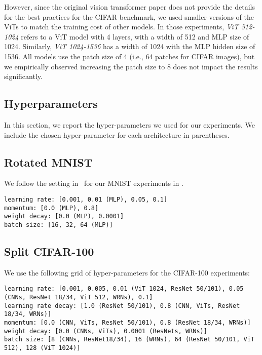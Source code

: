 However, since the original vision transformer paper does not provide the details for the best practices for the CIFAR benchmark, we used smaller versions of the ViTs to match the training cost of other models. In those experiments, \emph{ViT 512-1024} refers to a ViT model with 4 layers, with a width of 512 and MLP size of 1024. Similarly, \emph{ViT 1024-1536} has a width of 1024 with the MLP hidden size of 1536. All models use the patch size of 4 (i.e., 64 patches for CIFAR images), but we empirically observed increasing the patch size to 8 does not impact the results significantly.


\subsection{Hyperparameters}
In this section, we report the hyper-parameters we used for our experiments. We include the chosen hyper-parameter for each architecture in parentheses.

\subsection{Rotated MNIST}
We follow the setting in~\citep{Mirzadeh2021WideNN} for our MNIST experiments in .
\begin{scriptsize}
\begin{verbatim}
learning rate: [0.001, 0.01 (MLP), 0.05, 0.1]
momentum: [0.0 (MLP), 0.8]
weight decay: [0.0 (MLP), 0.0001]
batch size: [16, 32, 64 (MLP)]
\end{verbatim}
\end{scriptsize}

\subsection{Split CIFAR-100}
We use the following grid of hyper-parameters for the CIFAR-100 experiments:

\begin{scriptsize}
\begin{verbatim}
learning rate: [0.001, 0.005, 0.01 (ViT 1024, ResNet 50/101), 0.05 (CNNs, ResNet 18/34, ViT 512, WRNs), 0.1]
learning rate decay: [1.0 (ResNet 50/101), 0.8 (CNN, ViTs, ResNet 18/34, WRNs)]
momentum: [0.0 (CNN, ViTs, ResNet 50/101), 0.8 (ResNet 18/34, WRNs)]
weight decay: [0.0 (CNNs, ViTs), 0.0001 (ResNets, WRNs)]
batch size: [8 (CNNs, ResNet18/34), 16 (WRNs), 64 (ResNet 50/101, ViT 512), 128 (ViT 1024)]
\end{verbatim}
\end{scriptsize}

